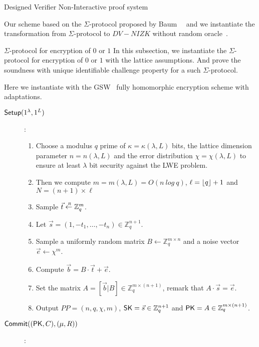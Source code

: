 \begin{section}{Designed Verifier Non-Interactive proof system}

  Our scheme based on the $\Sigma$-protocol proposed by Baum~\etal~\cite{DBLP:journals/iacr/BaumDOP16} and we instantiate the transformation from $\Sigma$-protocol to $DV-NIZK$ without random oracle~\cite{DBLP:conf/pkc/ChaidosG15}.

  \begin{subsection}{$\Sigma$-protocol for encryption of $0$ or $1$}
    In this subsection, we instantiate the $\Sigma$-protocol for encryption of $0$ or $1$ with the lattice assumptions.
    And prove the soundness with unique identifiable challenge property for a such $\Sigma$-protocol.
    
    Here we instantiate with the GSW~\cite{DBLP:conf/crypto/GentrySW13} fully homomorphic encryption scheme with adaptations.
    \begin{description}

      \item[${\mathsf{Setup}}(1^\lambda, 1^L)$]:
        \begin{enumerate}
        \item Choose a modulus $q$ prime of $\kappa = \kappa(\lambda, L)$ bits, the lattice dimension parameter $n = n (\lambda, L)$ and the error distribution $\chi = \chi(\lambda, L)$ to ensure at least $\lambda$ bit security against the LWE problem.
        \item Then we compute $m = m (\lambda, L) = O (n~log~q)$, $\ell = \lfloor q\rfloor + 1$ and $N = (n+1) \times \ell$
        \item Sample $\vec{t} \stackrel{{\scriptscriptstyle \mkern4mu R}}{\gets} \mathbb{Z}_q^m$.
        \item Let $\vec{s} = (1, -t_1, \dots, -t_n) \in \mathbb{Z}_q^{n+1}$.
        \item Sample a uniformly random matrix $B  \gets \mathbb{Z}_q^{m\times n}$ and a noise vector $\vec{e} \gets \chi^{m}$.
        \item Compute $\vec{b} = B \cdot \vec{t} + \vec{e}$. 
        \item Set the matrix $A = [\vec{b} | B ] \in \mathbb{Z}_q^{m \times (n+1)}$, remark that $A \cdot \vec{s} = \vec{e}$.
        \item Output $PP = (n, q, \chi, m)$, $\mathsf{SK} = \vec{s} \in \mathbb{Z}_q^{n+1}$ and $\mathsf{PK} = A \in \mathbb{Z}_q^{m \times (n+1)}$.
        \end{enumerate}
      \item[${\mathsf{Commit}}((\mathsf{PK}, C), (\mu, R))$]:


\end{description}
\end{subsection}
\end{section}
